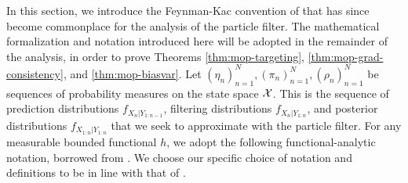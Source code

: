

In this section, we introduce the Feynman-Kac convention of \cite{delMoral04} that has since become commonplace \cite{karjalainen23} for the analysis of the particle filter. The mathematical formalization and notation introduced here will be adopted in the remainder of the analysis, in order to prove Theorems \ref{thm:mop-targeting}, \ref{thm:mop-grad-consistency}, and \ref{thm:mop-biasvar}. Let $(\eta_n)_{n=1}^N, (\pi_n)_{n=1}^N, (\rho_n)_{n=1}^N$ be sequences of probability measures on the state space ${\mathcal{X}}$. This is the sequence of prediction distributions $f_{X_{n}|Y_{1:n-1}}$, filtering distributions $f_{X_{n}|Y_{1:n}}$, and posterior distributions $f_{X_{1:n}|Y_{1:n}}$ that we seek to approximate with the particle filter. For any measurable bounded functional $h$, we adopt the following functional-analytic notation, borrowed from \cite{delMoral04, chopin20, karjalainen23}. We choose our specific choice of notation and definitions to be in line with that of \cite{karjalainen23}. 

